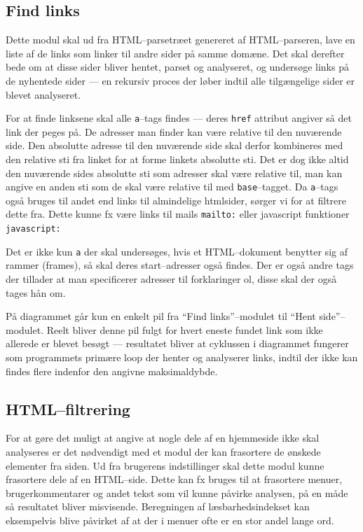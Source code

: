 \documentclass[a4paper,oneside,article]{memoir}
\begin{document}
\subsection{Find links}
Dette modul skal ud fra HTML--parsetræet genereret af HTML--parseren,
lave en liste af de links som linker til andre sider på samme domæne.
Det skal derefter bede om at disse sider bliver hentet, parset og
analyseret, og undersøge links på de nyhentede sider --- en rekursiv
proces der løber indtil alle tilgængelige sider er blevet analyseret.

For at finde linksene skal alle \texttt{a}--tags findes --- deres
\texttt{href} attribut angiver så det link der peges på. De adresser
man finder kan være relative til den nuværende side. Den absolutte
adresse til den nuværende side skal derfor kombineres med den relative
sti fra linket for at forme linkets absolutte sti. Det er dog ikke
altid den nuværende sides absolutte sti som adresser skal være
relative til, man kan angive en anden sti som de skal være relative
til med \texttt{base}--tagget. Da \texttt{a}--tags også bruges til andet 
end links til almindelige htmlsider, sørger vi for at filtrere dette fra. 
Dette kunne fx være links til mails \texttt{mailto:} eller javascript
funktioner \texttt{javascript:}

Det er ikke kun \texttt{a} der skal undersøges, hvis et HTML--dokument
benytter sig af rammer (frames), så skal deres start--adresser også
findes. Der er også andre tags der tillader at man specificerer
adresser til forklaringer ol, disse skal der også tages hån om.

På diagrammet går kun en enkelt pil fra ``Find links''--modulet til
``Hent side''--modulet. Reelt bliver denne pil fulgt for hvert eneste
fundet link som ikke allerede er blevet besøgt --- resultatet bliver at
cyklussen i diagrammet fungerer som programmets primære loop der
henter og analyserer links, indtil der ikke kan findes flere indenfor
den angivne maksimaldybde.

\subsection{HTML--filtrering}
For at gøre det muligt at angive at nogle dele af en hjemmeside ikke
skal analyseres er det nødvendigt med et modul der kan frasortere de
ønskede elementer fra siden. Ud fra brugerens indstillinger skal dette
modul kunne frasortere dele af en HTML--side. Dette kan fx bruges
til at frasortere menuer, brugerkommentarer og andet tekst som vil
kunne påvirke analysen, på en måde så resultatet bliver
misvisende. Beregningen af læsbarhedsindekset kan eksempelvis blive
påvirket af at der i menuer ofte er en stor andel lange ord.
\end{document}
